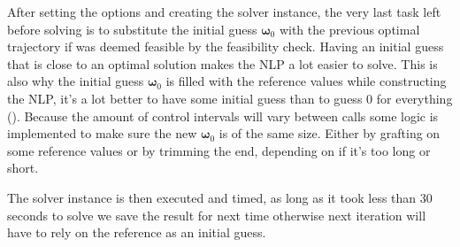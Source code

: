 After setting the options and creating the solver instance, the very last task left before solving is to
substitute the initial guess $\bm{\omega}_0$ with the previous optimal trajectory if was deemed feasible
by the feasibility check. Having an initial guess that is close to an optimal solution makes the \gls{NLP}
a lot easier to solve. This is also why the initial guess $\bm{\omega}_0$ is filled with the reference values while
constructing the NLP, it's a lot better to have some initial guess than to guess 0 for everything (\cite{gros2017Lecture}).
Because the amount of control intervals will vary between calls some logic is implemented to make sure the new
$\bm{\omega}_0$ is of the same size. Either by grafting on some reference values or by trimming the end, depending on
if it's too long or short.

The solver instance is then executed and timed, as long as it took less than 30 seconds to solve we save the result for next time
otherwise next iteration will have to rely on the reference as an initial guess.






\newpage